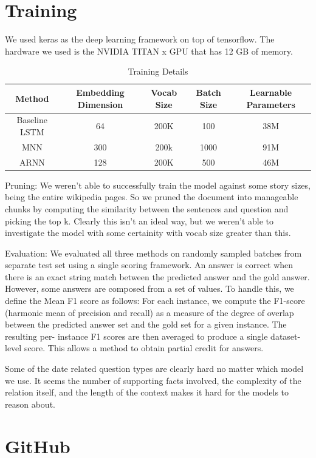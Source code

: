 \documentclass{article}
\begin{document}
\section{Training}
\label{Training}
We used keras as the deep learning framework on top of tensorflow. The hardware we used is the NVIDIA TITAN x GPU that has 12 GB of memory. 

\begin{table}[h!]
\centering
\begin{tabular}{ |c|c|c|c|c| }
\hline
Method & Embedding Dimension & Vocab Size & Batch Size &Learnable Parameters\\
\hline 
 Baseline LSTM & 64 & 200K & 100 & 38M \\ 
 \hline
 MNN & 300 & 200k & 1000 & 91M\\  
 \hline
 ARNN & 128 & 200K & 500 & 46M \\
 \hline
\end{tabular}
\caption{Training Details}
\end{table}

Pruning: We weren't able to successfully train the model against some story sizes, being the entire wikipedia pages. So we pruned the document into manageable chunks by computing the similarity between the sentences and question and picking the top k. Clearly this isn't an ideal way, but we weren't able to investigate the model with some certainity with vocab size greater than this.

Evaluation: We evaluated all three methods on randomly sampled batches from separate test set using a single scoring framework.  An answer  is  correct  when  there  is  an  exact  string match between the predicted answer and the gold answer. However, some answers are composed from a set of values. To handle this, we define the Mean F1 score as follows:  For each instance, we compute the F1-score (harmonic mean
of precision and recall) as a measure of the degree
of overlap between the predicted answer set and
the gold set for a given instance. The resulting per-
instance F1 scores are then averaged to produce a
single dataset-level score.   This allows a method
to obtain partial credit for answers.

Some of the date related question types are clearly hard no matter which model we use. It seems the number
of supporting facts involved, the complexity of the
relation itself, and the length of the context makes it hard for the models to reason about.

\section*{GitHub}
\end{document}
